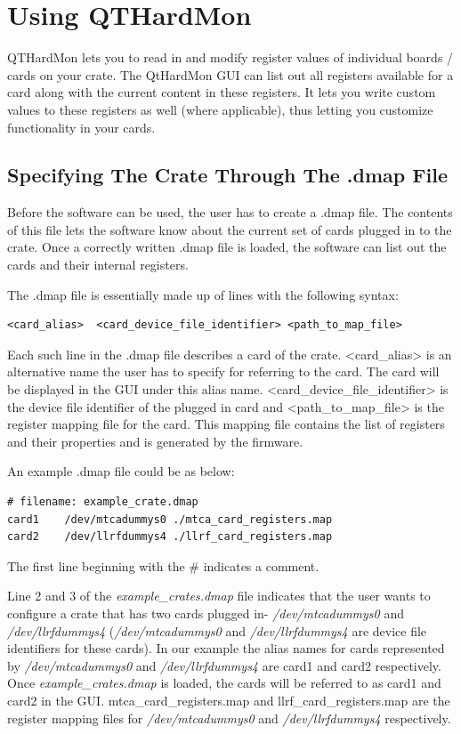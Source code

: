 \chapter{Using QTHardMon}

QTHardMon lets you to read in and modify register values of individual boards / cards on your crate. The QtHardMon GUI can list out all registers available for a card along with the current content in these registers. It lets you write custom values to these registers as well (where applicable), thus letting you customize functionality in your cards.

\section{Specifying The Crate Through The .dmap File}
Before the software can be used, the user has to create a .dmap file. The contents of this file lets the software know about the current set of cards plugged in to the crate. Once a correctly written .dmap file is loaded, the software can list out the cards and their internal registers. 

The .dmap file is essentially made up of lines with the following syntax:
\begin{lstlisting}
<card_alias>  <card_device_file_identifier> <path_to_map_file>
\end{lstlisting}

Each such line in the .dmap file describes a card of the crate.
\mbox{\textless card\_alias\textgreater}  is an alternative name the user has to specify for referring to the card. The card will be displayed in the GUI under this alias name.
\mbox{\textless card\_device\_file\_identifier\textgreater} is the device file identifier of the plugged in card and \mbox{\textless path\_to\_map\_file\textgreater} is the register mapping file for the card. This mapping file contains the list of registers and their properties and is generated by the firmware.
	

An example .dmap file could be as below:
\begin{lstlisting}
# filename: example_crate.dmap
card1    /dev/mtcadummys0 ./mtca_card_registers.map
card2    /dev/llrfdummys4 ./llrf_card_registers.map
\end{lstlisting}


The first line beginning with the \# indicates a comment. 

Line 2 and 3 of the \textit{example\_crates.dmap} file indicates that the user wants to configure a crate that has two cards plugged in- \textit{/dev/mtcadummys0} and \textit{/dev/llrfdummys4} (\textit{/dev/mtcadummys0} and \textit{/dev/llrfdummys4} are device file identifiers for these cards).  In our example the alias names for cards represented by \textit{/dev/mtcadummys0} and \textit{/dev/llrfdummys4} are card1 and card2 respectively. Once \textit{example\_crates.dmap} is loaded, the cards will be referred to as card1 and card2 in the GUI.
mtca\_card\_registers.map and llrf\_card\_registers.map are the register mapping files for \textit{/dev/mtcadummys0} and \textit{/dev/llrfdummys4} respectively. 


